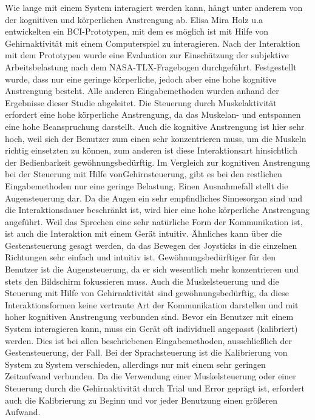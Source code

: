 \newline \newline
Wie lange mit einem System interagiert werden kann, hängt unter anderem von der kognitiven und körperlichen Anstrengung ab. Elisa Mira Holz u.a \cite{holz2013brain} entwickelten ein BCI-Prototypen, mit dem es möglich ist mit Hilfe von Gehirnaktivität mit einem Computerspiel zu interagieren. Nach der Interaktion mit dem Prototypen wurde eine Evaluation zur Einschätzung der subjektive Arbeitsbelastung nach dem NASA-TLX-Fragebogen durchgeführt. Festgestellt wurde, dass nur eine geringe körperliche, jedoch aber eine hohe kognitive Anstrengung besteht. Alle anderen Eingabemethoden wurden anhand der Ergebnisse dieser Studie abgeleitet. Die Steuerung durch Muskelaktivität erfordert eine hohe körperliche Anstrengung, da das Muskelan- und entspannen eine hohe Beanspruchung darstellt. Auch die kognitive Anstrengung ist hier sehr hoch, weil sich der Benutzer zum einen sehr konzentrieren muss, um die Muskeln richtig einsetzten zu können, zum anderen ist diese Interaktionsart hinsichtlich der Bedienbarkeit gewöhnungsbedürftig. Im Vergleich zur kognitiven Anstrengung bei der Steuerung mit Hilfe von\linebreak Gehirnsteuerung, gibt es bei den restlichen Eingabemethoden nur eine geringe Belastung. Einen Ausnahmefall stellt die Augensteuerung dar. Da die Augen ein sehr empfindliches Sinnesorgan sind und die Interaktionsdauer beschränkt ist, wird hier eine hohe körperliche Anstrengung angeführt.
\newline \newline
Weil das Sprechen eine sehr natürliche Form der Kommunikation ist, ist auch die Interaktion mit einem Gerät intuitiv. Ähnliches kann über die Gestensteuerung gesagt werden, da das Bewegen des Joysticks in die einzelnen Richtungen sehr einfach und intuitiv ist. Gewöhnungsbedürftiger für den Benutzer ist die Augensteuerung, da er sich wesentlich mehr konzentrieren und stets den Bildschirm fokussieren muss. Auch die Muskelsteuerung und die Steuerung mit Hilfe von Gehirnaktivität sind gewöhnungsbedürftig, da diese Interaktionsformen keine vertraute Art der Kommunikation darstellen und mit hoher kognitiven Anstrengung verbunden sind.
\newline \newline
Bevor ein Benutzer mit einem System interagieren kann, muss ein Gerät oft individuell angepasst (kalibriert) werden. Dies ist bei allen beschriebenen Eingabemethoden, ausschließlich der Gestensteuerung, der Fall. Bei der Sprachsteuerung ist die Kalibrierung von System zu System verschieden, allerdings nur mit einem sehr geringen Zeitaufwand verbunden. Da die Verwendung einer Muskelsteuerung oder einer Steuerung durch die Gehirnaktivität durch Trial und Error geprägt ist, erfordert auch die Kalibrierung zu Beginn und vor jeder Benutzung einen größeren Aufwand.
